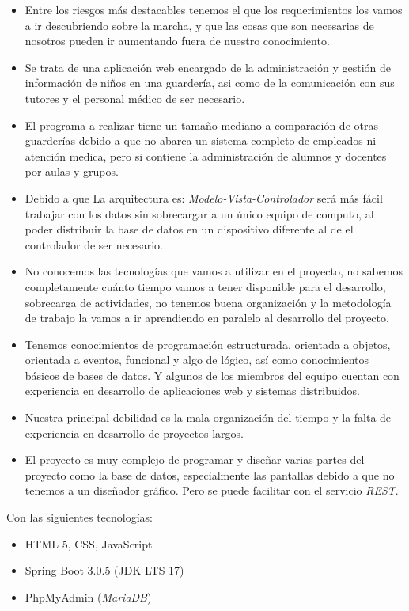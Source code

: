 \documentclass{article}
\begin{document}
\begin{itemize}
	\item Entre los riesgos más destacables tenemos el que los requerimientos los vamos a ir descubriendo sobre la marcha, y que las cosas que son necesarias de nosotros pueden ir aumentando fuera de nuestro conocimiento.
	\item Se trata de una aplicación web encargado de la administración y gestión de información de niños en una guardería, asi como de la comunicación con sus tutores y el personal médico de ser necesario.
	\item El programa a realizar tiene un tamaño mediano a comparación de otras guarderías debido a que no abarca un sistema completo de empleados ni atención medica, pero si contiene la administración de alumnos y docentes por aulas y grupos.
	\item Debido a que La arquitectura es: \emph{Modelo-Vista-Controlador} será más fácil trabajar con los datos sin sobrecargar a un único equipo de computo, al poder distribuir la base de datos en un dispositivo diferente al de el controlador de ser necesario.
	\item No conocemos las tecnologías que vamos a utilizar en el proyecto, no sabemos completamente cuánto tiempo vamos a tener disponible para el desarrollo, sobrecarga de actividades, no tenemos buena organización y la metodología de trabajo la vamos a ir aprendiendo en paralelo al desarrollo del proyecto.

	\item Tenemos conocimientos de programación estructurada, orientada a objetos, orientada a eventos, funcional y algo de lógico, así como conocimientos básicos de bases de datos. Y algunos de los miembros del equipo cuentan con experiencia en desarrollo de aplicaciones web y sistemas distribuidos.

	\item Nuestra principal debilidad es la mala organización del tiempo y la falta de experiencia en desarrollo de proyectos largos.

	\item El proyecto es muy complejo de programar y diseñar varias partes del proyecto como la base de datos, especialmente las pantallas debido a que no tenemos a un diseñador gráfico. Pero se puede facilitar con el servicio \emph{REST}.

\end{itemize}

Con las siguientes tecnologías:
\begin{itemize}
	\item HTML 5, CSS, JavaScript
	\item Spring Boot 3.0.5 (JDK LTS 17)
	\item PhpMyAdmin (\emph{MariaDB})
\end{itemize}
\end{document}
